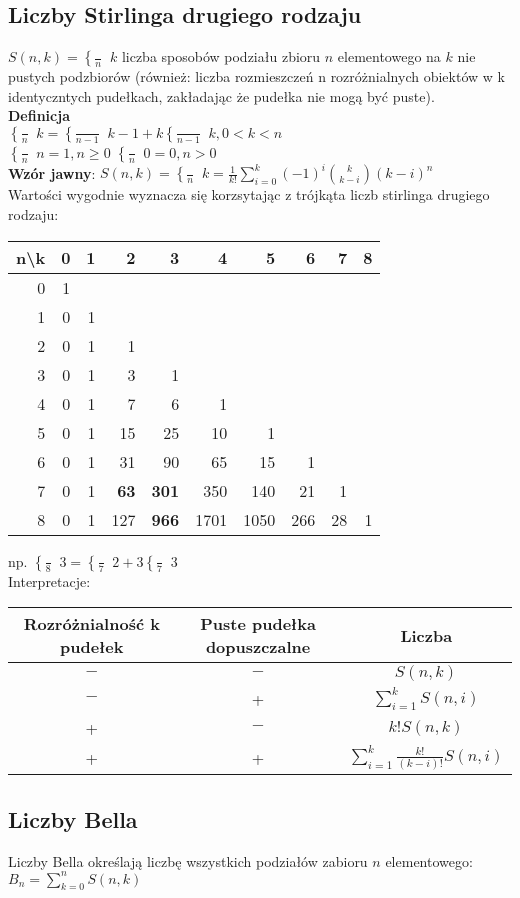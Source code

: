\documentclass[a4paper,12pt]{article}
\DeclareRobustCommand{\Stirling}{\genfrac \{ \} {0pt}{}} %
\begin{document}
\subsection{Liczby Stirlinga drugiego rodzaju}
$S(n,k)=\Stirling{n}{k}$ liczba sposobów podziału zbioru $n$ elementowego na $k$ nie pustych podzbiorów (również: liczba rozmieszczeń n rozróżnialnych obiektów w k identyczntych pudełkach, zakładając że pudełka nie mogą być puste).\\
\textbf{Definicja}\\
$\Stirling{n}{k}=\Stirling{n-1}{k-1}+k\Stirling{n-1}{k}, 0<k<n$ \\
$\Stirling{n}{n}=1, n\geq0$ $\Stirling{n}{0}=0, n>0$ \\
\textbf{Wzór jawny}: $S(n,k)=\Stirling{n}{k}=\frac{1}{k!}\sum_{i=0}^k(-1)^i{{k}\choose{k-i}}(k-i)^n$ \\
Wartości wygodnie wyznacza się korzsytając z trójkąta liczb stirlinga drugiego rodzaju:\\
\begin{tabular}{|r|r|r|r|r|r|r|r|r|r|} 
 \hline
 n\textbackslash k & 0 & 1 & 2 & 3 & 4 & 5 & 6 & 7 & 8\\ \hline
 0&1&&&&&&&& \\ \hline
 1&0&1&&&&&&&\\ \hline
 2&0&1&1&&&&&&\\ \hline
 3&0&1&3&1&&&&&\\ \hline
 4&0&1&7&6&1&&&&\\ \hline
 5&0&1&15&25&10&1&&&\\ \hline
 6&0&1&31&90&65&15&1&&\\ \hline
 7&0&1&\textbf{63}&\textbf{301}&350&140&21&1&\\ \hline
 8&0&1&127&\textbf{966}&1701&1050&266&28&1\\ \hline
\end{tabular}
np. $\Stirling{8}{3}=\Stirling{7}{2}+3\Stirling{7}{3}$\\
Interpretacje:\\
\begin{tabular}{c|c|c}
 Rozróżnialność k pudełek & Puste pudełka dopuszczalne & Liczba\\ \hline
 $-$ & $-$ & $S(n,k)$ \\
 $-$ & + & $\sum_{i=1}^k S(n,i)$ \\
 + & $-$ & $k! S(n,k)$ \\
 + & + & $\sum_{i=1}^k\frac{k!}{(k-i)!}S(n,i)$\\
\end{tabular}
\subsection{Liczby Bella}
Liczby Bella określają liczbę wszystkich podziałów zabioru $n$ elementowego: $B_n=\sum^n_{k=0}S(n,k)$
\end{document}
